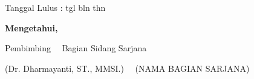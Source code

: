 \begin{center}
    \vspace{0.1cm}
    \begin{flushright}
        {Tanggal Lulus : tgl bln thn}
    \end{flushright}

    {\bf Mengetahui,}

    \vspace{0.5cm}

    {Pembimbing~ \hspace{5.0cm} ~Bagian Sidang Sarjana}%

    \vspace{1.5cm}

    {(Dr. Dharmayanti, ST., MMSI.)~ \hfill ~(NAMA BAGIAN SARJANA)}%


\end{center}
